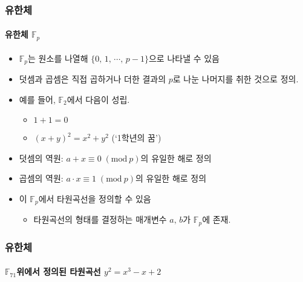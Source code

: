 \documentclass[aspectratio=169,mathserif]{beamer}
\newcommand{\Fp}{\mathbb{F}_p}
\begin{document}
  \begin{frame}
    \frametitle{유한체}
    \framesubtitle{유한체 \(\Fp\)}

    \begin{itemize}
      \item \(\Fp\)는 원소를 나열해 \(\{0,\,1,\,\cdots,\,p-1\}\)으로 나타낼 수 있음
      \item 덧셈과 곱셈은 직접 곱하거나 더한 결과의 \(p\)로 나눈 나머지를 취한 것으로 정의.
      \pause
      \item 예를 들어, \(\mathbb{F}_2\)에서 다음이 성립.
      \begin{itemize}
        \item \(1+1=0\)
        \item \((x+y)^2=x^2+y^2\) (`1학년의 꿈')
      \end{itemize}
      \pause
      \item 덧셈의 역원: \(a+x\equiv 0\;(\mathrm{mod}\:p)\)의 유일한 해로 정의
      \item 곱셈의 역원: \(a\cdot x\equiv 1\;(\mathrm{mod}\:p)\)의 유일한 해로 정의
      \pause
      \item 이 \(\Fp\)에서 타원곡선을 정의할 수 있음
      \begin{itemize}
        \item 타원곡선의 형태를 결정하는 매개변수 \(a,\,b\)가 \(\Fp\)에 존재.
      \end{itemize}
    \end{itemize}
  \end{frame}

  \begin{frame}
    \frametitle{유한체}
    \framesubtitle{\(\mathbb{F}_{71}\)위에서 정의된 타원곡선 \(y^2 = x^3 - x + 2\)}

    \begin{columns}
      \begin{figure}
        \raggedleft
        \scalebox{0.5}{}
      \end{figure}
      \pause
      \begin{figure}
        \scalebox{0.5}{}
      \end{figure}
    \end{columns}
  \end{frame}
\end{document}
